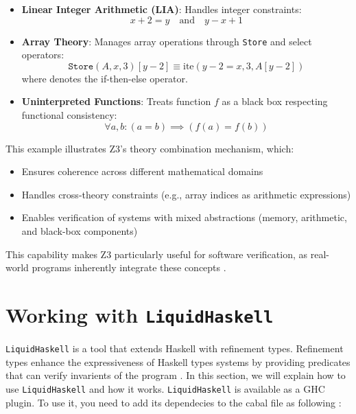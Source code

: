 \documentclass[]{rptuseminar}
\begin{document}
\begin{itemize}
    \item \textbf{Linear Integer Arithmetic (LIA)}: Handles integer constraints:
    \begin{equation*}
        x + 2 = y \quad \text{and} \quad y - x + 1
    \end{equation*}
    
    \item \textbf{Array Theory}: Manages array operations through \texttt{Store} and select operators:
    \begin{equation*}
        \texttt{Store}(A, x, 3)[y - 2] \equiv \text{ite}(y - 2 = x, 3, A[y - 2])
    \end{equation*}
    where  denotes the if-then-else operator.
    
    \item \textbf{Uninterpreted Functions}: Treats function $f$ as a black box respecting functional consistency:
    \begin{equation*}
        \forall a, b: (a = b) \implies (f(a) = f(b))
    \end{equation*}
\end{itemize}

This example illustrates Z3's theory combination mechanism, which:
\begin{itemize}
    \item Ensures coherence across different mathematical domains
    \item Handles cross-theory constraints (e.g., array indices as arithmetic expressions)
    \item Enables verification of systems with mixed abstractions (memory, arithmetic, and black-box components)
\end{itemize}

This capability makes Z3 particularly useful for software verification, as real-world programs inherently integrate these concepts \cite{nikolaj_bjorner_programming_nodate}.
\section{Working with \texttt{LiquidHaskell}}
\label{sec:lh}
\texttt{LiquidHaskell} is a tool that extends Haskell with refinement types. Refinement types enhance 
the expressiveness of Haskell types systems by providing predicates that can verify invarients of the program \cite{vazou_refinement_2014}.
In this section, we will explain how to use \texttt{LiquidHaskell} and how it works.
\texttt{LiquidHaskell} is available as a GHC plugin. To use it, you need to add its dependecies to the cabal file as following \cite{noauthor_ucsd-progsyslh-plugin-demo_2024}:
\end{document}
